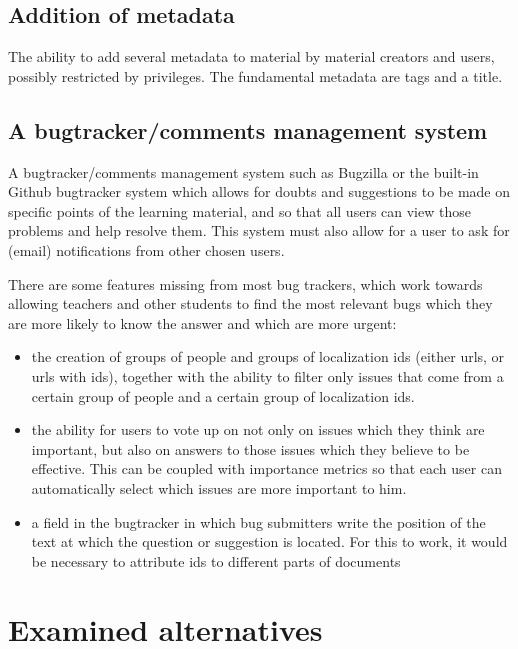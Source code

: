 \documentclass[12pt]{article}
\begin{document}
\subsection{Addition of metadata}

The ability to add several metadata to material by material creators and users, possibly restricted by privileges. The fundamental metadata are tags and a title.
  
\subsection{A bugtracker/comments management system}

A bugtracker/comments management system such as Bugzilla or the built-in Github bugtracker system which allows for doubts and suggestions to be made on specific points of the learning material, and so that all users can view those problems and help resolve them. This system must also allow for a user to ask for (email) notifications from other chosen users.
  
There are some features missing from most bug trackers, which work towards allowing teachers and other students to find the most relevant bugs which they are more likely to know the answer and which are more urgent:
  
\begin{itemize}
  \item the creation of groups of people and groups of localization ids (either urls, or urls with ids), together with the ability to filter only issues that come from a certain group of people and a certain group of localization ids.
  \item the ability for users to vote up on not only on issues which they think are important, but also on answers to those issues which they believe to be effective. This can be coupled with importance metrics so that each user can automatically select which issues are more important to him.
  \item a field in the bugtracker in which bug submitters write the position of the text at which the question or suggestion is located. For this to work, it would be necessary to attribute ids to different parts of documents
\end{itemize}

\section{Examined alternatives}
\end{document}
